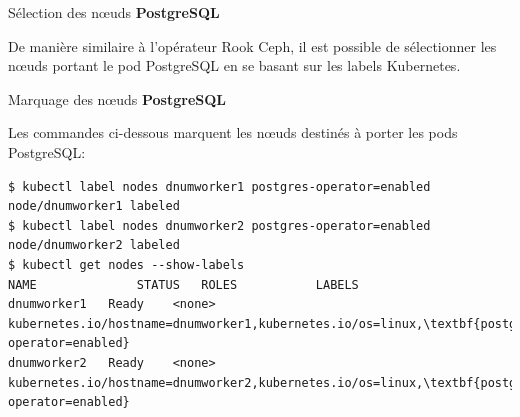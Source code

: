 \begin{frame}[fragile]{Sélection des n\oe{}uds \textbf{PostgreSQL}}

   De manière similaire à l'opérateur Rook Ceph, il est possible de sélectionner les n\oe{}uds portant le pod PostgreSQL en se basant sur les labels Kubernetes.\\
\end{frame}


\begin{frame}[shrink=5,fragile]{Marquage des n\oe{}uds \textbf{PostgreSQL}}

   Les commandes ci-dessous marquent les n\oe{}uds destinés à porter les pods PostgreSQL:
\begin{tiny}
\begin{Verbatim}[commandchars=\\\{\}]
$ kubectl label nodes dnumworker1 postgres-operator=enabled
node/dnumworker1 labeled
$ kubectl label nodes dnumworker2 postgres-operator=enabled
node/dnumworker2 labeled
$ kubectl get nodes --show-labels
NAME              STATUS   ROLES           LABELS
dnumworker1   Ready    <none>          kubernetes.io/hostname=dnumworker1,kubernetes.io/os=linux,\textbf{postgres-operator=enabled}
dnumworker2   Ready    <none>          kubernetes.io/hostname=dnumworker2,kubernetes.io/os=linux,\textbf{postgres-operator=enabled}
\end{Verbatim}
\end{tiny}
\end{frame}


